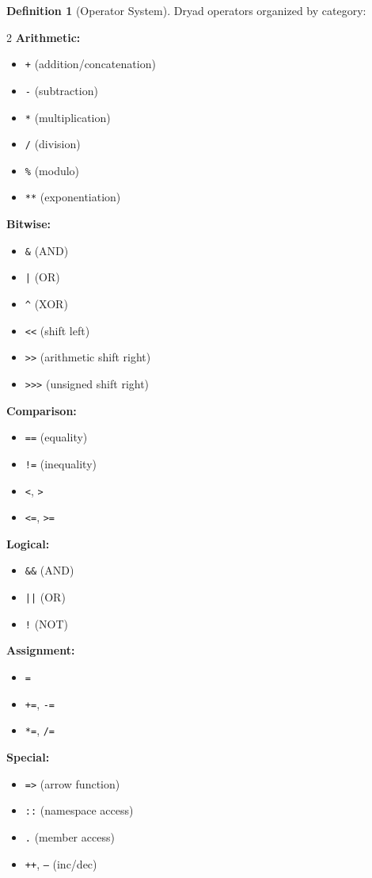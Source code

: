 \documentclass[12pt,a4paper]{article}
\theoremstyle{definition}
\newtheorem{definition}{Definition}[section]
\begin{document}
\begin{definition}[Operator System]
Dryad operators organized by category:

\begin{multicols}{2}
\textbf{Arithmetic:}
\begin{itemize}[noitemsep]
    \item \texttt{+} (addition/concatenation)
    \item \texttt{-} (subtraction)
    \item \texttt{*} (multiplication)
    \item \texttt{/} (division)
    \item \texttt{\%} (modulo)
    \item \texttt{**} (exponentiation)
\end{itemize}

\textbf{Bitwise:}
\begin{itemize}[noitemsep]
    \item \texttt{\&} (AND)
    \item \texttt{|} (OR)
    \item \texttt{\textasciicircum} (XOR)
    \item \texttt{<<} (shift left)
    \item \texttt{>>} (arithmetic shift right)
    \item \texttt{>>>} (unsigned shift right)
\end{itemize}

\textbf{Comparison:}
\begin{itemize}[noitemsep]
    \item \texttt{==} (equality)
    \item \texttt{!=} (inequality)
    \item \texttt{<}, \texttt{>}
    \item \texttt{<=}, \texttt{>=}
\end{itemize}

\textbf{Logical:}
\begin{itemize}[noitemsep]
    \item \texttt{\&\&} (AND)
    \item \texttt{||} (OR)
    \item \texttt{!} (NOT)
\end{itemize}

\textbf{Assignment:}
\begin{itemize}[noitemsep]
    \item \texttt{=}
    \item \texttt{+=}, \texttt{-=}
    \item \texttt{*=}, \texttt{/=}
\end{itemize}

\textbf{Special:}
\begin{itemize}[noitemsep]
    \item \texttt{=>} (arrow function)
    \item \texttt{::} (namespace access)
    \item \texttt{.} (member access)
    \item \texttt{++}, \texttt{--} (inc/dec)
\end{itemize}
\end{multicols}
\end{definition}
\end{document}
